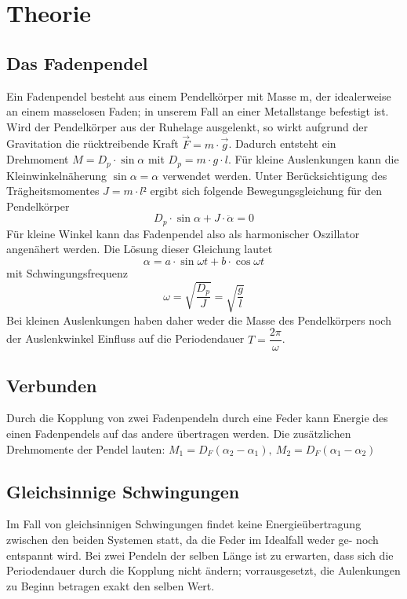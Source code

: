 \section{Theorie}
\label{sec:Theorie}
\subsection{Das Fadenpendel}
    Ein Fadenpendel besteht aus einem Pendelkörper mit Masse m, der idealerweise 
    an einem masselosen Faden; in unserem Fall an einer Metallstange befestigt ist.
    Wird der Pendelkörper aus der Ruhelage ausgelenkt, so wirkt aufgrund der 
    Gravitation die rücktreibende Kraft $\vec{F}=m\cdot \vec{g}$. Dadurch entsteht  
    ein Drehmoment $M= D_p \cdot \sin{\alpha}$ mit $D_p= m\cdot g\cdot l$. Für kleine Auslenkungen 
    kann die Kleinwinkelnäherung $\sin{\alpha}=\alpha$ verwendet werden. %
    Unter Berücksichtigung des Trägheitsmomentes $J=m\cdot l²$ ergibt sich folgende Bewegungsgleichung 
    für den Pendelkörper
    \begin{equation}
        D_p \cdot \sin{\alpha}+J\cdot \ddot \alpha=0
    \end{equation}
    Für kleine Winkel kann das Fadenpendel also als harmonischer Oszillator angenähert werden.
    Die Lösung dieser Gleichung lautet
    \begin{equation}
        \alpha=a\cdot \sin{\omega t} + b\cdot \cos{\omega t}
    \end{equation}
    mit Schwingungsfrequenz
    \begin{equation}
        \omega= \sqrt{\dfrac{D_p}{J}}=\sqrt{\dfrac{g}{l}}
    \end{equation}
    Bei kleinen Auslenkungen haben daher weder die Masse des Pendelkörpers noch der
    Auslenkwinkel Einfluss auf die Periodendauer $T=\dfrac{2\pi}{\omega}$.

\subsection{Verbunden}
    Durch die Kopplung von zwei Fadenpendeln durch eine Feder kann Energie des einen 
    Fadenpendels auf das andere übertragen werden. Die zusätzlichen Drehmomente der Pendel
    lauten: $M_1=D_F(\alpha_2-\alpha_1),\ M_2=D_F(\alpha_1-\alpha_2)$
    \subsection{Gleichsinnige Schwingungen}
        Im Fall von gleichsinnigen Schwingungen findet keine Energieübertragung zwischen
        den beiden Systemen statt, da die Feder im Idealfall weder ge- noch entspannt wird.
        Bei zwei Pendeln der selben Länge ist zu erwarten, dass sich die Periodendauer durch
        die Kopplung nicht ändern; vorrausgesetzt, die Aulenkungen zu Beginn betragen exakt 
        den selben Wert.
